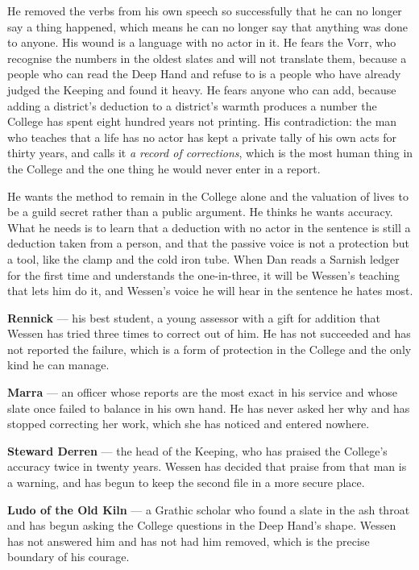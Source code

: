 \documentclass{design/chronicle}
\begin{document}
{
He removed the verbs from his own speech so successfully that he can no longer say a thing happened, which means he can no longer say that anything was done to anyone. His wound is a language with no actor in it. He fears the Vorr, who recognise the numbers in the oldest slates and will not translate them, because a people who can read the Deep Hand and refuse to is a people who have already judged the Keeping and found it heavy. He fears anyone who can add, because adding a district’s deduction to a district’s warmth produces a number the College has spent eight hundred years not printing. His contradiction: the man who teaches that a life has no actor has kept a private tally of his own acts for thirty years, and calls it \emph{a record of corrections}, which is the most human thing in the College and the one thing he would never enter in a report.

He wants the method to remain in the College alone and the valuation of lives to be a guild secret rather than a public argument. He thinks he wants accuracy. What he needs is to learn that a deduction with no actor in the sentence is still a deduction taken from a person, and that the passive voice is not a protection but a tool, like the clamp and the cold iron tube. When Dan reads a Sarnish ledger for the first time and understands the one-in-three, it will be Wessen’s teaching that lets him do it, and Wessen’s voice he will hear in the sentence he hates most.

\textbf{Rennick} — his best student, a young assessor with a gift for addition that Wessen has tried three times to correct out of him. He has not succeeded and has not reported the failure, which is a form of protection in the College and the only kind he can manage.

\textbf{Marra} — an officer whose reports are the most exact in his service and whose slate once failed to balance in his own hand. He has never asked her why and has stopped correcting her work, which she has noticed and entered nowhere.

\textbf{Steward Derren} — the head of the Keeping, who has praised the College’s accuracy twice in twenty years. Wessen has decided that praise from that man is a warning, and has begun to keep the second file in a more secure place.

\textbf{Ludo of the Old Kiln} — a Grathic scholar who found a slate in the ash throat and has begun asking the College questions in the Deep Hand’s shape. Wessen has not answered him and has not had him removed, which is the precise boundary of his courage.

}
\end{document}
